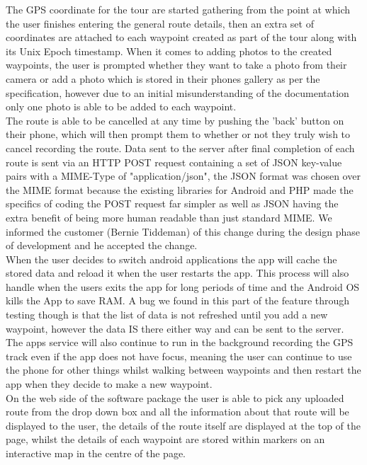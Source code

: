 \documentclass{article}
\begin{document}
		The GPS coordinate for the tour are started gathering from the point at which the user finishes entering the general route details, then an extra set of coordinates are attached to each waypoint created as part of the tour along with its Unix Epoch timestamp. When it comes to adding photos to the created waypoints, the user is prompted whether they want to take a photo from their camera or add a photo which is stored in their phones gallery as per the specification, however due to an initial misunderstanding of the documentation only one photo is able to be added to each waypoint. \\
		
		The route is able to be cancelled at any time by pushing the 'back' button on their phone, which will then prompt them to whether or not they truly wish to cancel recording the route. Data sent to the server after final completion of each route is sent via an HTTP POST request containing a set of JSON key-value pairs with a MIME-Type of "application/json", the JSON format was chosen over the MIME format because the existing libraries for Android and PHP made the specifics of coding the POST request far simpler as well as JSON having the extra benefit of being more human readable than just standard MIME. We informed the customer (Bernie Tiddeman) of this change during the design phase of development and he accepted the change. \\
		
		When the user decides to switch android applications the app will cache the stored data and reload it when the user restarts the app. This process will also handle when the users exits the app for long periods of time and the Android OS kills the App to save RAM. A bug we found in this part of the feature through testing though is that the list of data is not refreshed until you add a new waypoint, however the data IS there either way and can be sent to the server. The apps service will also continue to run in the background recording the GPS track even if the app does not have focus, meaning the user can continue to use the phone for other things whilst walking between waypoints and then restart the app when they decide to make a new waypoint. \\
		
		On the web side of the software package the user is able to pick any uploaded route from the drop down box and all the information about that route will be displayed to the user, the details of the route itself are displayed at the top of the page, whilst the details of each waypoint are stored within markers on an interactive map in the centre of the page. \\
		
\end{document}
